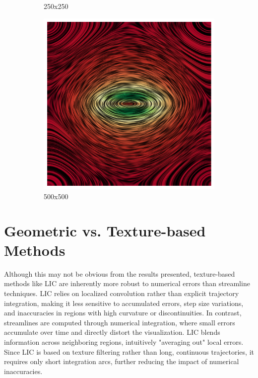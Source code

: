 \documentclass{article}
\begin{document}
\begin{figure}[h!]
\begin{subfigure}{0.32\textwidth}
        \caption{250x250}
    \end{subfigure}
    \hfill
    \begin{subfigure}{0.32\textwidth}
        \centering
        \includegraphics[width=\textwidth]{metsim_500_500.png}
        \caption{500x500}
    \end{subfigure}
    \caption{}
\end{figure}

\section{Geometric vs. Texture-based Methods}
Although this may not be obvious from the results presented, texture-based methods like LIC are inherently more robust to numerical errors than streamline techniques. LIC relies on localized convolution rather than explicit trajectory integration, making it less sensitive to accumulated errors, step size variations, and inaccuracies in regions with high curvature or discontinuities.
In contrast, streamlines are computed through numerical integration, where small errors accumulate over time and directly distort the visualization. LIC blends information across neighboring regions, intuitively "averaging out" local errors. Since LIC is based on texture filtering rather than long, continuous trajectories, it requires only short integration arcs, further reducing the impact of numerical inaccuracies.
\end{document}
